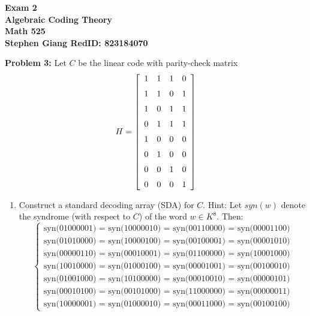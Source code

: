 \documentclass[11pt]{article}
\newcommand{\skipline}{\vspace{\baselineskip}}
\newenvironment{problem}[1]{\textbf{Problem #1: }}{\newpage}
\begin{document}
	
	\begin{center}
		\textbf{Exam 2} \\
		\textbf{Algebraic Coding Theory} \\
		\textbf{Math 525} \\
		\textbf{Stephen Giang RedID: 823184070} \\
		\skipline \skipline
	\end{center}
	
	\begin{problem}{3}
		Let $C$ be the linear code with parity-check matrix
		\[H = \left[\begin{array}{cccc}
			1&1&1&0 \\
			\noalign{\medskip} 1&1&0&1 \\
			\noalign{\medskip} 1&0&1&1 \\
			\noalign{\medskip} 0&1&1&1 \\
			\noalign{\medskip} 1&0&0&0 \\
			\noalign{\medskip} 0&1&0&0 \\
			\noalign{\medskip} 0&0&1&0 \\
			\noalign{\medskip} 0&0&0&1 \\
		\end{array}\right]\]
		\begin{enumerate}[label = (\alph*)]
			\item Construct a standard decoding array (SDA) for $C$.  Hint: Let $syn(w)$ denote the syndrome (with respect to $C$) of the word $w\in K^8$. Then: 
			\[\begin{cases}
				\text{syn(01000001)  =  syn(10000010)  =  syn(00110000)  =  syn(00001100)} \\
				\text{syn(01010000)  =  syn(10000100)  =  syn(00100001)  =  syn(00001010)} \\
				\text{syn(00000110)  =  syn(00010001)  =  syn(01100000)  =  syn(10001000)} \\
				\text{syn(10010000)  =  syn(01000100)  =  syn(00001001)  =  syn(00100010)} \\
				\text{syn(01001000)  =  syn(10100000)  =  syn(00010010)  =  syn(00000101)} \\
				\text{syn(00010100)  =  syn(00101000)  =  syn(11000000)  =  syn(00000011)} \\
				\text{syn(10000001)  =  syn(01000010)  =  syn(00011000)  =  syn(00100100)}
			\end{cases}\]
			\begin{figure}[h!]
				\centering
				\begin{tabular}{c|c}

\end{tabular}
\end{figure}
\end{enumerate}
\end{problem}
\end{document}
